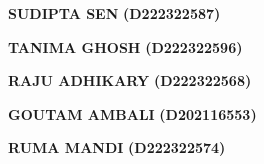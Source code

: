 \documentclass[12pt,a4paper]{report}
\begin{document}
\vspace{1 cm}                        
\begin{multicols}{3}
\centering
\textbf{SUDIPTA SEN}
\textbf{(D222322587)}\\
\vspace{0.3cm}


\textbf{TANIMA GHOSH}
\textbf{(D222322596)}\\
\vspace{0.3cm}


\textbf{RAJU ADHIKARY}
\textbf{(D222322568)}\\
\vspace{0.3cm}


\textbf{GOUTAM AMBALI}
\textbf{(D202116553)}\\
\vspace{0.3cm}
\sloppy

\textbf{RUMA MANDI}
\textbf{(D222322574)}\\
\vspace{0.3cm}
\end{multicols}

\tableofcontents %


\listoffigures



\newpage




\newpage














\end{document}

